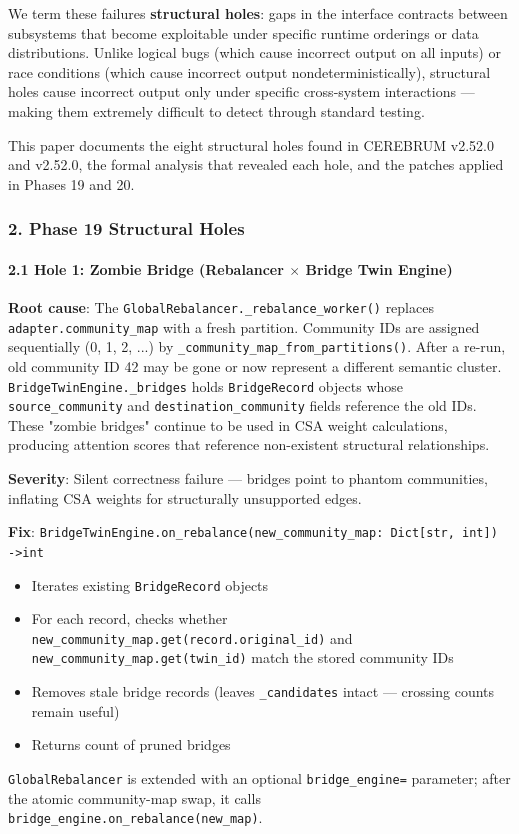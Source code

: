 We term these failures \textbf{structural holes}: gaps in the interface contracts between subsystems that become exploitable under specific runtime orderings or data distr\-ibutions. Unlike logical bugs (which cause incorrect output on all inputs) or race conditions (which cause incorrect output nonde\-terministi\-cally), structural holes cause incorrect output only under specific cross-system inter\-actions — making them extremely difficult to detect through standard testing.

This paper documents the eight structural holes found in CEREBRUM v2.52.0 and v2.52.0, the formal analysis that revealed each hole, and the patches applied in Phases 19 and 20.

\subsubsection{2. Phase 19 Structural Holes}

\paragraph{2.1 Hole 1: Zombie Bridge (Rebalancer $\times$ Bridge Twin Engine)}

\textbf{Root cause}: The \texttt{GlobalRebalancer.\_rebalance\_worker()} replaces \texttt{adapter.community\_map} with a fresh partition. Community IDs are assigned seque\-ntially (0, 1, 2, ...) by \texttt{\_community\_map\_from\_partitions()}. After a re-run, old community ID 42 may be gone or now represent a different semantic cluster. \texttt{BridgeTwinEngine.\_bridges} holds \texttt{BridgeRecord} objects whose \texttt{source\_community} and \texttt{destination\_community} fields reference the old IDs. These "zombie bridges" continue to be used in CSA weight calcu\-lations, producing attention scores that reference non-existent structural relat\-ionships.

\textbf{Severity}: Silent correctness failure — bridges point to phantom communities, inflating CSA weights for struc\-turally unsupported edges.

\textbf{Fix}: \texttt{BridgeTwinEngine.on\_rebalance(new\_community\_map: Dict[str, int]) -\textgreater  int}
\begin{itemize}
\item Iterates existing \texttt{BridgeRecord} objects
\item For each record, checks whether \texttt{new\_community\_map.get(record.original\_id)} and \texttt{new\_community\_map.get(twin\_id)} match the stored community IDs
\item Removes stale bridge records (leaves \texttt{\_candidates} intact — crossing counts remain useful)
\item Returns count of pruned bridges

\end{itemize}
\texttt{GlobalRebalancer} is extended with an optional \texttt{bridge\_engine=} parameter; after the atomic community-map swap, it calls \texttt{bridge\_engine.on\_rebalance(new\_map)}.

